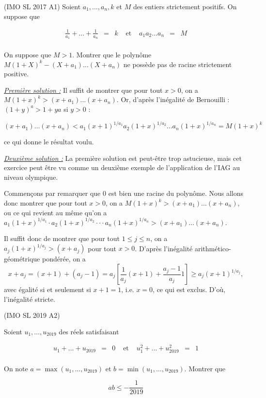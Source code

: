 \begin{exo}
(IMO SL 2017 A1)
Soient $a_1, \ldots, a_n, k$ et $M$ des entiers strictement positifs. On suppose que 

\[\begin{array}{lllllll}
\frac1{a_1}+ \ldots + \frac1{a_n} &=& k &\text{ et }& a_1 a_2 \ldots a_n &=& M\\
\end{array}\]

On suppose que $M>1$. Montrer que le polynôme $M(1+X)^k-(X+a_1) \ldots (X+a_n)$ ne possède pas de racine strictement positive. 
\end{exo}

\begin{sol}

\underline{\textit{Première solution :}}
Il suffit de montrer que pour tout $x>0$, on a $M(1+x)^k > (x+a_1) \ldots (x+a_n)$. Or, d'après l'inégalité de Bernouilli : $(1+y)^a > 1+ya$ si $y>0$ : 

\[ (x+a_1) \ldots (x+a_n) < a_1(x+1)^{1/a_1} a_2 (1+x)^{1/a_2} \ldots a_n (1+x)^{1/a_n} = M(1+x)^k\]

ce qui donne le résultat voulu. 

\underline{\textit{Deuxième solution :}}
La première solution est peut-être trop astucieuse, mais cet exercice peut être vu comme un deuxième exemple de l'application de l'IAG au niveau olympique.

Commençons par remarquer que $0$ est bien une racine du polynôme. Nous allons donc montrer que pour tout $x>0$, on a $M(1+x)^k > (x+a_1) \ldots (x+a_n)$, ou ce qui revient au même qu'on a $a_1(1+x)^{1/a_1} \cdot a_2(1+x)^{1/a_2} \cdot \cdot \cdot a_n(1+x)^{1/a_n} >(x+a_1) \ldots (x+a_n)$.

Il suffit donc de montrer que pour tout $1 \leq j \leq n$, on a $a_j(1+x)^{1/a_j} > (x+a_j)$ pour tout $x>0$. D'après l'inégalité arithmético-géométrique pondérée, on a
\[
x+a_j=(x+1)+(a_j-1)=a_j\left[\frac1{a_j}(x+1)+\frac{a_j-1}{a_j}1\right] \geq a_j(x+1)^{1/a_j},
\]
avec égalité si et seulement si $x+1=1$, i.e. $x=0$, ce qui est exclus. D'où, l'inégalité stricte.
\end{sol}


\begin{exo}
(IMO SL 2019 A2)

Soient $u_1, \ldots , u_{2019}$ des réels satisfaisant 

\[\begin{array}{lllllll}
u_1 + \ldots + u_{2019} &=& 0 & \text{ et } & u_1^2+ \ldots + u_{2019}^2 &=& 1 \\
\end{array}\]

On note $a= \max (u_1, \ldots , u_{2019})$ et $b= \min (u_1, \ldots , u_{2019})$. Montrer que 

\[ab \leqslant - \frac1{2019}\]
\end{exo}


